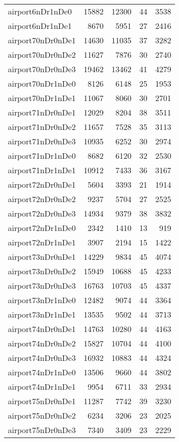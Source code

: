 \begin{tabular}{lrrrr}
airport6nDr1nDe0 & 15882 & 12300 & 44 & 3538 \\
airport6nDr1nDe1 & 8670 & 5951 & 27 & 2416 \\
airport70nDr0nDe1 & 14630 & 11035 & 37 & 3282 \\
airport70nDr0nDe2 & 11627 & 7876 & 30 & 2740 \\
airport70nDr0nDe3 & 19462 & 13462 & 41 & 4279 \\
airport70nDr1nDe0 & 8126 & 6148 & 25 & 1953 \\
airport70nDr1nDe1 & 11067 & 8060 & 30 & 2701 \\
airport71nDr0nDe1 & 12029 & 8204 & 38 & 3511 \\
airport71nDr0nDe2 & 11657 & 7528 & 35 & 3113 \\
airport71nDr0nDe3 & 10935 & 6252 & 30 & 2974 \\
airport71nDr1nDe0 & 8682 & 6120 & 32 & 2530 \\
airport71nDr1nDe1 & 10912 & 7433 & 36 & 3167 \\
airport72nDr0nDe1 & 5604 & 3393 & 21 & 1914 \\
airport72nDr0nDe2 & 9237 & 5704 & 27 & 2525 \\
airport72nDr0nDe3 & 14934 & 9379 & 38 & 3832 \\
airport72nDr1nDe0 & 2342 & 1410 & 13 & 919 \\
airport72nDr1nDe1 & 3907 & 2194 & 15 & 1422 \\
airport73nDr0nDe1 & 14229 & 9834 & 45 & 4074 \\
airport73nDr0nDe2 & 15949 & 10688 & 45 & 4233 \\
airport73nDr0nDe3 & 16763 & 10703 & 45 & 4337 \\
airport73nDr1nDe0 & 12482 & 9074 & 44 & 3364 \\
airport73nDr1nDe1 & 13535 & 9502 & 44 & 3713 \\
airport74nDr0nDe1 & 14763 & 10280 & 44 & 4163 \\
airport74nDr0nDe2 & 15827 & 10704 & 44 & 4100 \\
airport74nDr0nDe3 & 16932 & 10883 & 44 & 4324 \\
airport74nDr1nDe0 & 13506 & 9660 & 44 & 3802 \\
airport74nDr1nDe1 & 9954 & 6711 & 33 & 2934 \\
airport75nDr0nDe1 & 11287 & 7742 & 39 & 3230 \\
airport75nDr0nDe2 & 6234 & 3206 & 23 & 2025 \\
airport75nDr0nDe3 & 7340 & 3409 & 23 & 2229 \\

\end{tabular}

